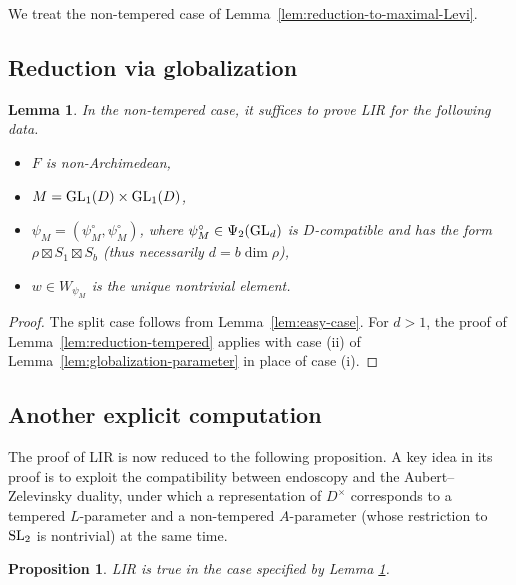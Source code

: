 \documentclass[11pt,reqno]{amsart}
\theoremstyle{plain}
\newtheorem{prop}[thm]{Proposition}
\newtheorem{lem}[thm]{Lemma}
\theoremstyle{definition}
\newcommand{\SL}{\tu{SL}}
\newcommand{\GL}{\tu{GL}}
\newcommand{\tu}{\textup}
\numberwithin{equation}{subsection}
\begin{document}
We treat the non-tempered case of Lemma~\ref{lem:reduction-to-maximal-Levi}.

\subsection{Reduction via globalization}

\begin{lem}\label{lem:reduction-nontempered}
In the non-tempered case, it suffices to prove LIR for the following data.
\begin{itemize}
\item $F$ is non-Archimedean,
\item $M=\GL_{1}(D)\times \GL_{1}(D)$,
\item $\psi_M=(\psi_M^\circ,\psi_M^\circ)$, where
$\psi^\circ_M\in \Psi_2(\GL_{d})$ is $D$-compatible and has the form $\rho\boxtimes S_1\boxtimes S_b$ (thus necessarily $d=b\dim\rho$),
\item $w\in W_{\psi_M}$ is the unique nontrivial element.
\end{itemize}
\end{lem}

\begin{proof}
The split case follows from Lemma~\ref{lem:easy-case}. For $d>1$,
the proof of Lemma~\ref{lem:reduction-tempered} applies with
case (ii) of Lemma~\ref{lem:globalization-parameter} in place of case (i).
\end{proof}


\subsection{Another explicit computation}


The proof of LIR is now reduced to the following proposition. A key idea in its proof is to exploit the compatibility between endoscopy and the Aubert--Zelevinsky duality, under which a representation of $D^\times$ corresponds to a tempered $L$-parameter and a non-tempered $A$-parameter (whose restriction to $\SL_2$ is nontrivial) at the same time.


\begin{prop}\label{prop:LIR-nontempered-special-case-1}
LIR is true in the case specified by Lemma \ref{lem:reduction-nontempered}.
\end{prop}
\end{document}

